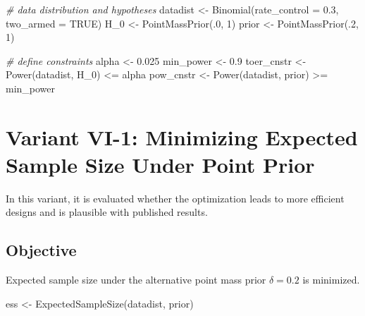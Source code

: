 \documentclass[
]{book}
\newenvironment{Shaded}{\begin{snugshade}}{\end{snugshade}}
\newcommand{\AttributeTok}[1]{\textcolor[rgb]{0.77,0.63,0.00}{#1}}
\newcommand{\CommentTok}[1]{\textcolor[rgb]{0.56,0.35,0.01}{\textit{#1}}}
\newcommand{\ConstantTok}[1]{\textcolor[rgb]{0.00,0.00,0.00}{#1}}
\newcommand{\DecValTok}[1]{\textcolor[rgb]{0.00,0.00,0.81}{#1}}
\newcommand{\FloatTok}[1]{\textcolor[rgb]{0.00,0.00,0.81}{#1}}
\newcommand{\FunctionTok}[1]{\textcolor[rgb]{0.00,0.00,0.00}{#1}}
\newcommand{\NormalTok}[1]{#1}
\newcommand{\OtherTok}[1]{\textcolor[rgb]{0.56,0.35,0.01}{#1}}
\newcommand{\SpecialCharTok}[1]{\textcolor[rgb]{0.00,0.00,0.00}{#1}}
\begin{document}
\begin{Shaded}
\begin{Highlighting}[]
\CommentTok{\# data distribution and hypotheses}
\NormalTok{datadist   }\OtherTok{\textless{}{-}} \FunctionTok{Binomial}\NormalTok{(}\AttributeTok{rate\_control =} \FloatTok{0.3}\NormalTok{, }\AttributeTok{two\_armed =} \ConstantTok{TRUE}\NormalTok{)}
\NormalTok{H\_0        }\OtherTok{\textless{}{-}} \FunctionTok{PointMassPrior}\NormalTok{(.}\DecValTok{0}\NormalTok{, }\DecValTok{1}\NormalTok{)}
\NormalTok{prior      }\OtherTok{\textless{}{-}} \FunctionTok{PointMassPrior}\NormalTok{(.}\DecValTok{2}\NormalTok{, }\DecValTok{1}\NormalTok{)}

\CommentTok{\# define constraints}
\NormalTok{alpha      }\OtherTok{\textless{}{-}} \FloatTok{0.025}
\NormalTok{min\_power  }\OtherTok{\textless{}{-}} \FloatTok{0.9}
\NormalTok{toer\_cnstr }\OtherTok{\textless{}{-}} \FunctionTok{Power}\NormalTok{(datadist, H\_0)   }\SpecialCharTok{\textless{}=}\NormalTok{ alpha}
\NormalTok{pow\_cnstr  }\OtherTok{\textless{}{-}} \FunctionTok{Power}\NormalTok{(datadist, prior) }\SpecialCharTok{\textgreater{}=}\NormalTok{ min\_power}
\end{Highlighting}
\end{Shaded}

\hypertarget{variantVI_1}{%
\section{Variant VI-1: Minimizing Expected Sample Size Under Point Prior}\label{variantVI_1}}

In this variant, it is evaluated whether the optimization leads to more
efficient designs and is plausible with published results.

\hypertarget{objective-14}{%
\subsection{Objective}\label{objective-14}}

Expected sample size under the alternative point mass prior \(\delta = 0.2\)
is minimized.

\begin{Shaded}
\begin{Highlighting}[]
\NormalTok{ess }\OtherTok{\textless{}{-}} \FunctionTok{ExpectedSampleSize}\NormalTok{(datadist, prior)}
\end{Highlighting}
\end{Shaded}
\end{document}
